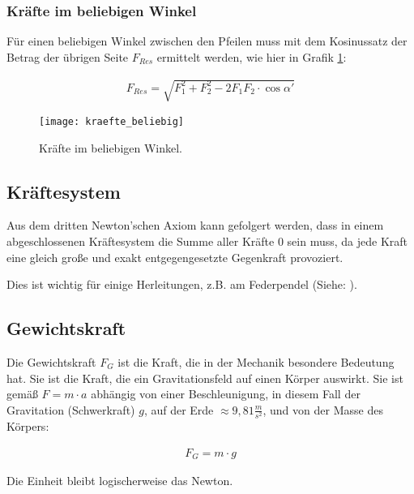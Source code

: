 \subsubsection{Kräfte im beliebigen Winkel}

\noindent Für einen beliebigen Winkel zwischen den Pfeilen muss mit dem Kosinussatz der Betrag der übrigen Seite $F_{Res}$ ermittelt werden, wie hier in Grafik \ref{fig:kraefte_beliebig}:

\begin{align}
	F_{Res} = \sqrt{F_1^2 + F_2^2 - 2F_1 F_2 \cdot \cos{\alpha '}}
\end{align}

\begin{figure}[H]
	\centering
	\texttt{[image: kraefte\_beliebig]}
	\caption{Kräfte im beliebigen Winkel.}
	\label{fig:kraefte_beliebig}
\end{figure}


\subsection{Kräftesystem}

Aus dem dritten Newton'schen Axiom kann gefolgert werden, dass in einem abgeschlossenen Kräftesystem die Summe aller Kräfte $0$ sein muss, da jede Kraft eine gleich große und exakt entgegengesetzte Gegenkraft provoziert.

Dies ist wichtig für einige Herleitungen, z.B. am Federpendel (Siehe: ).


\subsection{Gewichtskraft} \label{subsec:Gewichtskraft}

Die Gewichtskraft $F_{G}$ ist die Kraft, die in der Mechanik besondere Bedeutung hat. Sie ist die Kraft, die ein Gravitationsfeld auf einen Körper auswirkt. Sie ist gemäß $F = m \cdot a$ abhängig von einer Beschleunigung, in diesem Fall der Gravitation (Schwerkraft) $g$, auf der Erde $\approx 9,81 \frac{m}{s^2}$, und von der Masse des Körpers:

\begin{align}
	F_{G} = m \cdot g
\end{align}

\noindent Die Einheit bleibt logischerweise das Newton.